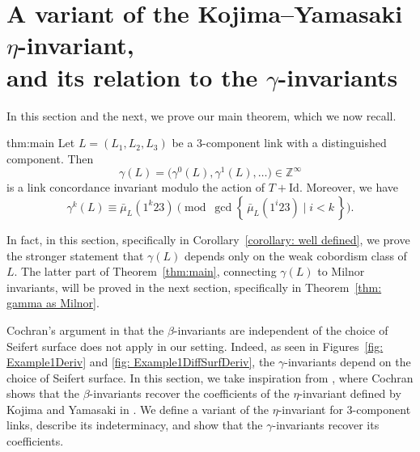 \documentclass[a4paper, 11pt]{amsart}
\theoremstyle{definition}
\newcommand{\Z}{\mathbb{Z}}
\begin{document}
\section{A variant of the Kojima--Yamasaki $\eta$-invariant,\\ and its relation to the $\gamma$-invariants}
\label{sect eta invt}

In this section and the next, we prove our main theorem, which we now recall.
\begin{reptheorem}{thm:main}
Let $L=(L_1,L_2,L_3)$ be a $3$-component link with a distinguished component. Then
\[
\gamma(L)=\bigl(\gamma^0(L),\gamma^1(L),\ldots\bigr)\in \Z^\infty
\]
is a link concordance invariant modulo the action of $T+\mathrm{Id}$. Moreover, we have
\[
\gamma^k(L)\equiv \bar{\mu}_L(1^k23)
\pmod{\gcd\left\{\, \bar{\mu}_L(1^i23)\mid i<k \,\right\}}.
\]
\end{reptheorem}
\noindent In fact, in this section, specifically in Corollary~\ref{corollary: well defined}, we prove the stronger statement that $\gamma(L)$ depends only on the weak cobordism class of $L$. The latter part of Theorem~\ref{thm:main}, connecting $\gamma(L)$ to Milnor invariants, will be proved in the next section, specifically in Theorem~\ref{thm: gamma as Milnor}.

Cochran's argument in \cite{C3} that the $\beta$-invariants are independent of the choice of Seifert surface does not apply in our setting. Indeed, as seen in Figures~\ref{fig: Example1Deriv} and \ref{fig: Example1DiffSurfDeriv}, the $\gamma$-invariants depend on the choice of Seifert surface. In this section, we take inspiration from \cite[Theorem~7.1]{C3}, where Cochran shows that the $\beta$-invariants recover the coefficients of the $\eta$-invariant defined by Kojima and Yamasaki in \cite{KojYam79}. We define a variant of the $\eta$-invariant for $3$-component links, describe its indeterminacy, and show that the $\gamma$-invariants recover its coefficients.
\end{document}
